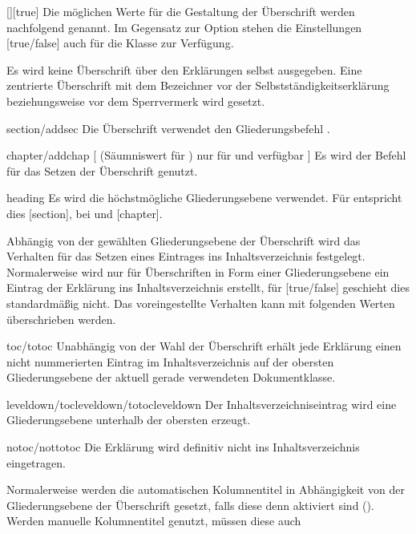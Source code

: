 \begin{Declaration}{[\PSet]}[true]
Die möglichen Werte für die Gestaltung der Überschrift werden nachfolgend 
genannt. Im Gegensatz zur Option  stehen die Einstellungen 
[true/false] auch für die Klasse  zur 
Verfügung.
%
\begin{values}
\itemfalse
  Es wird keine Überschrift über den Erklärungen selbst ausgegeben.
\itemtrue*
  Eine zentrierte Überschrift mit dem Bezeichner  vor 
  der Selbstständigkeitserklärung beziehungsweise  vor dem 
  Sperrvermerk wird gesetzt. 
\item[section/addsec]
  Die Überschrift verwendet den Gliederungsbefehl .
\item[chapter/addchap][%
    (Säumniswert für \Class{tudscrbook})
    nur für \Class{tudscrreprt} und \Class{tudscrbook} verfügbar%
  ]
  Es wird der Befehl  für das Setzen der Überschrift genutzt. 
\item[heading]
  Es wird die höchstmögliche Gliederungsebene verwendet. Für 
   entspricht dies [section], bei 
   und  [chapter].
\end{values}
%
Abhängig von der gewählten Gliederungsebene der Überschrift wird das Verhalten 
für das Setzen eines Eintrages ins Inhaltsverzeichnis festgelegt. Normalerweise 
wird nur für Überschriften in Form einer Gliederungsebene ein Eintrag der 
Erklärung ins Inhaltsverzeichnis erstellt, für [true/false] 
geschieht dies standardmäßig nicht. Das voreingestellte Verhalten kann mit 
folgenden Werten überschrieben werden.
%
\begin{values}
\item[toc/totoc]
  Unabhängig von der Wahl der Überschrift erhält jede Erklärung einen nicht
  nummerierten Eintrag im Inhaltsverzeichnis auf der obersten Gliederungsebene  
  der aktuell gerade verwendeten Dokumentklasse. 
\item[leveldown/tocleveldown/totocleveldown]
  Der Inhaltsverzeichniseintrag wird eine Gliederungsebene unterhalb der 
  obersten erzeugt.
\item[notoc/nottotoc]
  Die Erklärung wird definitiv nicht ins Inhaltsverzeichnis eingetragen.
\end{values}
%
Normalerweise werden die automatischen Kolumnentitel in Abhängigkeit von der 
Gliederungsebene der Überschrift gesetzt, falls diese denn aktiviert sind 
(). Werden manuelle Kolumnentitel genutzt, müssen diese auch 

\end{Declaration}
